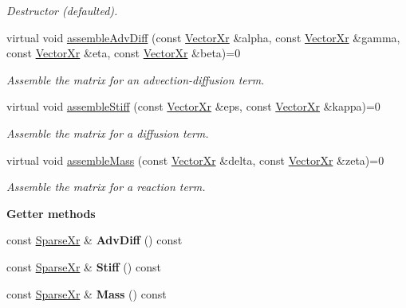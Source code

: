 \begin{DoxyCompactItemize}
\begin{DoxyCompactList}\small\item\em Destructor (defaulted). \end{DoxyCompactList}\item 
virtual void \hyperlink{classPdeSolver1D_a8eef3ec8fa2d444e8d0d1815d81e81f9}{assemble\-Adv\-Diff} (const \hyperlink{typedefs_8h_aae6cee78ed9cd8f234ed8cb48682548a}{Vector\-Xr} \&alpha, const \hyperlink{typedefs_8h_aae6cee78ed9cd8f234ed8cb48682548a}{Vector\-Xr} \&gamma, const \hyperlink{typedefs_8h_aae6cee78ed9cd8f234ed8cb48682548a}{Vector\-Xr} \&eta, const \hyperlink{typedefs_8h_aae6cee78ed9cd8f234ed8cb48682548a}{Vector\-Xr} \&beta)=0
\begin{DoxyCompactList}\small\item\em Assemble the matrix for an advection-\/diffusion term. \end{DoxyCompactList}\item 
virtual void \hyperlink{classPdeSolver1D_a0283447d8d645afde9fadb6adf224ee5}{assemble\-Stiff} (const \hyperlink{typedefs_8h_aae6cee78ed9cd8f234ed8cb48682548a}{Vector\-Xr} \&eps, const \hyperlink{typedefs_8h_aae6cee78ed9cd8f234ed8cb48682548a}{Vector\-Xr} \&kappa)=0
\begin{DoxyCompactList}\small\item\em Assemble the matrix for a diffusion term. \end{DoxyCompactList}\item 
virtual void \hyperlink{classPdeSolver1D_aa3dadbe748bfb8b897425e46500ab33b}{assemble\-Mass} (const \hyperlink{typedefs_8h_aae6cee78ed9cd8f234ed8cb48682548a}{Vector\-Xr} \&delta, const \hyperlink{typedefs_8h_aae6cee78ed9cd8f234ed8cb48682548a}{Vector\-Xr} \&zeta)=0
\begin{DoxyCompactList}\small\item\em Assemble the matrix for a reaction term. \end{DoxyCompactList}\end{DoxyCompactItemize}
\begin{Indent}{\bf Getter methods}\par
\begin{DoxyCompactItemize}
\item 
\hypertarget{classPdeSolver1D_aacae28f5283dba7ae6f396e4722b390a}{const \hyperlink{typedefs_8h_a6d3b7db3fa8171d0e743df848524c269}{Sparse\-Xr} \& {\bfseries Adv\-Diff} () const }\label{classPdeSolver1D_aacae28f5283dba7ae6f396e4722b390a}

\item 
\hypertarget{classPdeSolver1D_a453454d0773e196945f73967e4102ade}{const \hyperlink{typedefs_8h_a6d3b7db3fa8171d0e743df848524c269}{Sparse\-Xr} \& {\bfseries Stiff} () const }\label{classPdeSolver1D_a453454d0773e196945f73967e4102ade}

\item 
\hypertarget{classPdeSolver1D_a48f0820eba081a12bed887613dbf7187}{const \hyperlink{typedefs_8h_a6d3b7db3fa8171d0e743df848524c269}{Sparse\-Xr} \& {\bfseries Mass} () const }\label{classPdeSolver1D_a48f0820eba081a12bed887613dbf7187}

\end{DoxyCompactItemize}
\end{Indent}
